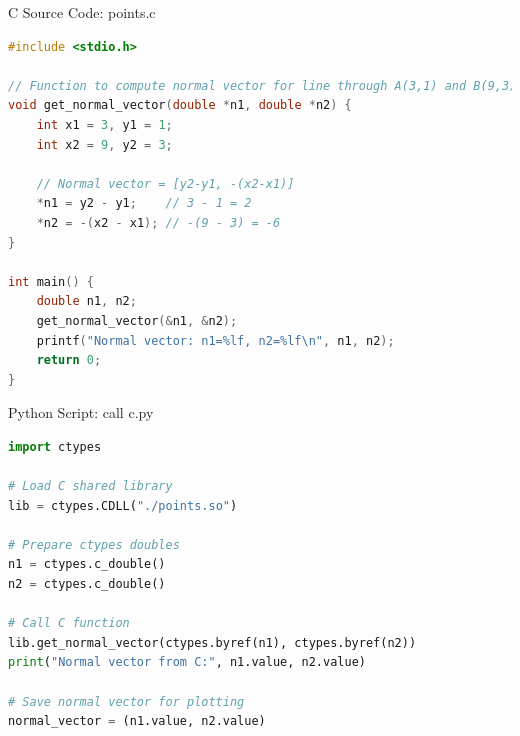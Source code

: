 \documentclass{beamer}
\numberwithin{equation}{section}
\begin{document}
\begin{frame}[fragile]{C Source Code: points.c}
\begin{lstlisting}[language=C]
#include <stdio.h>

// Function to compute normal vector for line through A(3,1) and B(9,3)
void get_normal_vector(double *n1, double *n2) {
    int x1 = 3, y1 = 1;
    int x2 = 9, y2 = 3;

    // Normal vector = [y2-y1, -(x2-x1)]
    *n1 = y2 - y1;    // 3 - 1 = 2
    *n2 = -(x2 - x1); // -(9 - 3) = -6
}

int main() {
    double n1, n2;
    get_normal_vector(&n1, &n2);
    printf("Normal vector: n1=%lf, n2=%lf\n", n1, n2);
    return 0;
}

\end{lstlisting}
\end{frame}

\begin{frame}[fragile]{Python Script: call c.py}
\begin{lstlisting}[language=Python]
import ctypes

# Load C shared library
lib = ctypes.CDLL("./points.so")

# Prepare ctypes doubles
n1 = ctypes.c_double()
n2 = ctypes.c_double()

# Call C function
lib.get_normal_vector(ctypes.byref(n1), ctypes.byref(n2))
print("Normal vector from C:", n1.value, n2.value)

# Save normal vector for plotting
normal_vector = (n1.value, n2.value)

\end{lstlisting}
\end{frame}
\end{document}
